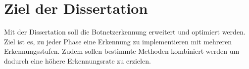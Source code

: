 \section{Ziel der Dissertation}

Mit der Dissertation soll die Botnetzerkennung erweitert und optimiert werden. Ziel ist es,
zu jeder Phase eine Erkennung zu implementieren mit mehreren Erkennungsstufen. Zudem sollen 
bestimmte Methoden kombiniert werden um dadurch eine höhere Erkennungsrate zu erzielen.

